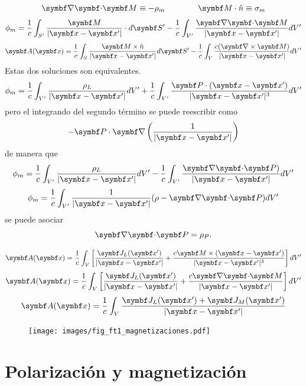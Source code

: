 \documentclass[10pt,oneside]{CBFT_book}
\begin{document}
\[
	\divem{M} \equiv -\rho_m \qquad \qquad \vb{M}\cdot\hat{n} \equiv \sigma_m
\]
\[
	\phi_m = \frac{1}{c} \int_{S'} \frac{\vb{M}}{|\vb{x}-\vb{x}'|} \cdot d\vb{S}' -
		\frac{1}{c} \int_{V'} \frac{\divem{M}}{|\vb{x}-\vb{x}'|} dV' 
\]
\[
	\vb{A}( \vb{x}) = \frac{1}{c} \int_S \frac{ \vb{M}\times\hat{n} }{|\vb{x}-\vb{x}'|} d\vb{S}' - 
		\frac{1}{c} \int_V \frac{ c(\rotorm{M}) }{|\vb{x}-\vb{x}'|}  dV'
\]
Estas dos soluciones son equivalentes.
\[
	\phi_m = \frac{1}{c} \int_{V'} \frac{\rho_L}{|\vb{x}-\vb{x}'|}  dV' +
		\frac{1}{c} \int_{V'} \frac{ \vb{P}\cdot(\vb{x}-\vb{x}')}{|\vb{x}-\vb{x}'|^3} dV' 
\]
pero el integrando del segundo término se puede reescribir como 
\[
	-\vb{P}\cdot\Nabla\left(\frac{1}{|\vb{x}-\vb{x}'|}\right)
\]
de manera que 
\[
	\phi_m = \frac{1}{c} \int_{V'} \frac{\rho_L}{|\vb{x}-\vb{x}'|}  dV' -
		\frac{1}{c} \int_{V'} \frac{ \divem{P}) }{|\vb{x}-\vb{x}'|} dV' 
\]
\[
	\phi_m = \frac{1}{c} \int_{V'} \frac{1}{|\vb{x}-\vb{x}'|}( \rho - \divem{P} )  dV'
\]
se puede asociar
\[
	\divem{P} = \rho_P.
\]

\[
	\vb{A}( \vb{x}) = \frac{1}{c} \int_V \left[ \frac{ \vb{J}_L(\vb{x}') }{|\vb{x}-\vb{x}'|} +
		\frac{ c \vb{M} \times (\vb{x}-\vb{x}') }{|\vb{x}-\vb{x}'|^3} \right] dV'
\]
\[
	\vb{A}( \vb{x}) = \frac{1}{c} \int_V \left[ \frac{ \vb{J}_L(\vb{x}') }{|\vb{x}-\vb{x}'|} +
		\frac{ c \divem{M} }{|\vb{x}-\vb{x}'|} \right] dV'
\]
\[
	\vb{A}( \vb{x}) = \frac{1}{c} \int_V \frac{ \vb{J}_L(\vb{x}') + \vb{J}_M(\vb{x}' ) }{|\vb{x}-\vb{x}'|}	
\]

\begin{figure}[htb]
	\begin{center}
	\texttt{[image: images/fig\_ft1\_magnetizaciones.pdf]}	 
	\end{center}
	\caption{}
\end{figure}


\section{Polarización y magnetización}
\end{document}
